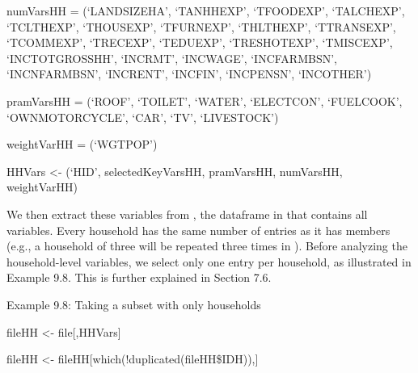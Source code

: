 \documentclass[letterpaper,10pt,english]{sphinxmanual}
\begin{document}
\begin{DUlineblock}{0em}
\item[] 
\item[] numVarsHH = (‘LANDSIZEHA’, ‘TANHHEXP’, ‘TFOODEXP’, ‘TALCHEXP’,
‘TCLTHEXP’, ‘THOUSEXP’, ‘TFURNEXP’, ‘THLTHEXP’, ‘TTRANSEXP’,
‘TCOMMEXP’, ‘TRECEXP’, ‘TEDUEXP’, ‘TRESHOTEXP’, ‘TMISCEXP’,
‘INCTOTGROSSHH’, ‘INCRMT’, ‘INCWAGE’, ‘INCFARMBSN’, ‘INCNFARMBSN’,
‘INCRENT’, ‘INCFIN’, ‘INCPENSN’, ‘INCOTHER’)
\item[] 
\item[] pramVarsHH = (‘ROOF’, ‘TOILET’, ‘WATER’, ‘ELECTCON’,
‘FUELCOOK’, ‘OWNMOTORCYCLE’, ‘CAR’, ‘TV’, ‘LIVESTOCK’)
\end{DUlineblock}

\begin{DUlineblock}{0em}
\item[] 
\item[] weightVarHH = (‘WGTPOP’)
\item[] 
\item[] HHVars \textless{}- (‘HID’, selectedKeyVarsHH, pramVarsHH, numVarsHH,
weightVarHH)
\end{DUlineblock}

We then extract these variables from , the dataframe in  that
contains all variables. Every household has the same number of entries
as it has members (e.g., a household of three will be repeated three
times in ). Before analyzing the household-level variables, we
select only one entry per household, as illustrated in Example 9.8. This
is further explained in Section 7.6.

Example 9.8: Taking a subset with only households

\begin{DUlineblock}{0em}
\item[] 
\item[] fileHH \textless{}- file{[},HHVars{]}
\end{DUlineblock}

\begin{DUlineblock}{0em}
\item[] 
\item[] fileHH \textless{}- fileHH{[}which(!duplicated(fileHH\$IDH)),{]}
\end{DUlineblock}
\end{document}
